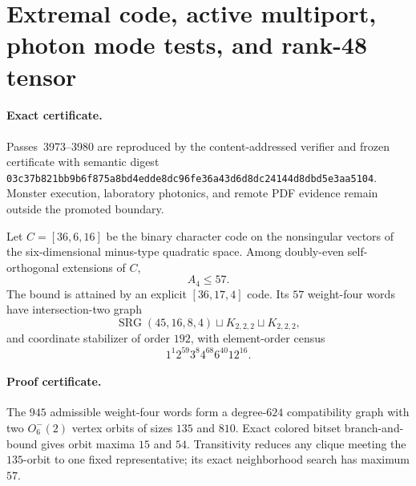 \makeatletter
{}
\makeatother
\section{Extremal code, active multiport, photon mode tests, and rank-48 tensor}
\label{sec:bt3973-bt3980-extremal-photon-tensor}

\paragraph{Exact certificate.}
Passes~3973--3980 are reproduced by the content-addressed verifier and frozen
certificate with semantic digest
\texttt{03c37b821bb9b6f875a8bd4edde8dc96fe36a43d6d8dc24144d8dbd5e3aa5104}.
Monster execution, laboratory photonics, and remote PDF evidence remain outside
the promoted boundary.

\begin{theorem}[Extremal $A_4=57$ extension]
Let $C=[36,6,16]$ be the binary character code on the nonsingular vectors of
the six-dimensional minus-type quadratic space.  Among doubly-even
self-orthogonal extensions of $C$,
\[
\boxed{A_4\le57}.
\]
The bound is attained by an explicit $[36,17,4]$ code.  Its $57$ weight-four
words have intersection-two graph
\[
\operatorname{SRG}(45,16,8,4)\sqcup K_{2,2,2}\sqcup K_{2,2,2},
\]
and coordinate stabilizer of order $192$, with element-order census
\[
1^1 2^{59}3^8 4^{68}6^{40}12^{16}.
\]
\end{theorem}

\paragraph{Proof certificate.}
The $945$ admissible weight-four words form a degree-$624$ compatibility graph
with two $O_6^-(2)$ vertex orbits of sizes $135$ and $810$.  Exact colored
bitset branch-and-bound gives orbit maxima $15$ and $54$.  Transitivity reduces
any clique meeting the $135$-orbit to one fixed representative; its exact
neighborhood search has maximum $57$.

